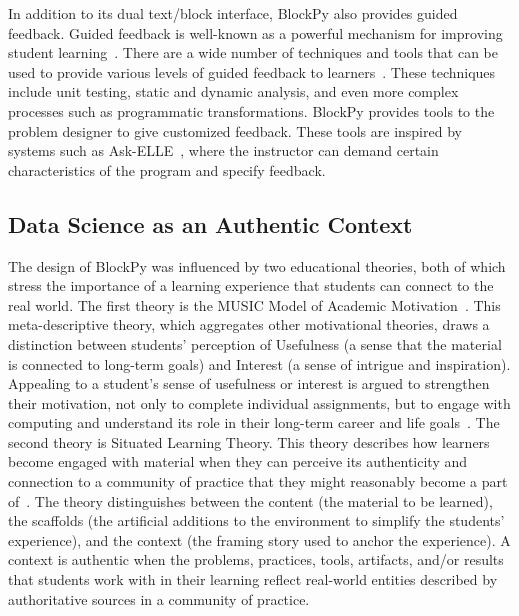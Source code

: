 \documentclass[10pt,journal,compsoc]{IEEEtran}
\begin{document}
In addition to its dual text/block interface, BlockPy also provides guided feedback.
Guided feedback is well-known as a powerful mechanism for improving student learning~\cite{shute2008focus}.
There are a wide number of techniques and tools that can be used to provide various levels of guided feedback to learners~\cite{feedback-review}.
These techniques include unit testing, static and dynamic analysis, and even more complex processes such as programmatic transformations.
BlockPy provides tools to the problem designer to give customized feedback.
These tools are inspired by systems such as Ask-ELLE~\cite{gerdes2015ask}, where the instructor can demand certain characteristics of the program and specify feedback.

\subsection{Data Science as an Authentic Context}

The design of BlockPy was influenced by two educational theories, both of which stress the importance of a learning experience that students can connect to the real world.
The first theory is the MUSIC Model of Academic Motivation~\cite{jones-description}.
This meta-descriptive theory, which aggregates other motivational theories, draws a distinction between students' perception of Usefulness (a sense that the material is connected to long-term goals) and Interest (a sense of intrigue and inspiration).
Appealing to a student's sense of usefulness or interest is argued to strengthen their motivation, not only to complete individual assignments, but to engage with computing and understand its role in their long-term career and life goals~\cite{forte2005motivation}.
The second theory is Situated Learning Theory.
This theory describes how learners become engaged with material when they can perceive its authenticity and connection to a community of practice that they might reasonably become a part of~\cite{lave1991situated}.
The theory distinguishes between the content (the material to be learned), the scaffolds (the artificial additions to the environment to simplify the students' experience), and the context (the framing story used to anchor the experience).
A context is authentic when the problems, practices, tools, artifacts, and/or results that students work with in their learning reflect real-world entities described by authoritative sources in a community of practice.
\end{document}

